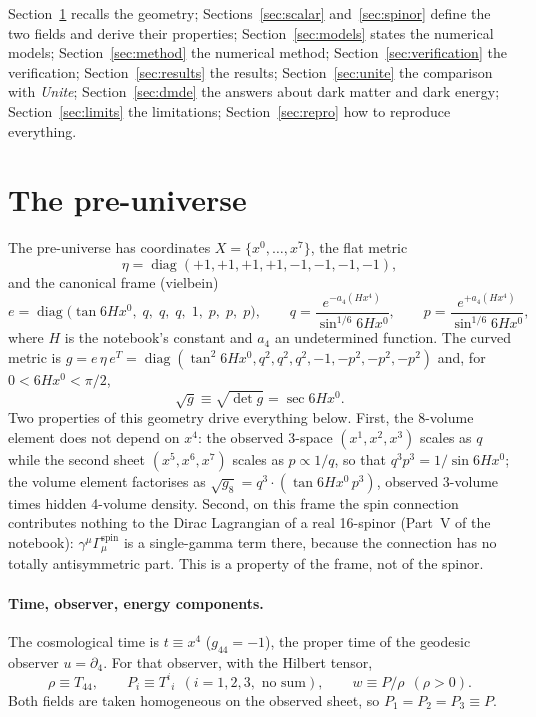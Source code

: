 \documentclass[11pt,a4paper]{article}
\newcommand{\diag}{\operatorname{diag}}
\begin{document}
Section~\ref{sec:frame} recalls the geometry; Sections~\ref{sec:scalar} and~\ref{sec:spinor}
define the two fields and derive their properties; Section~\ref{sec:models} states the numerical
models; Section~\ref{sec:method} the numerical method; Section~\ref{sec:verification} the
verification; Section~\ref{sec:results} the results; Section~\ref{sec:unite} the comparison with
\emph{Unite}; Section~\ref{sec:dmde} the answers about dark matter and dark energy;
Section~\ref{sec:limits} the limitations; Section~\ref{sec:repro} how to reproduce everything.

\section{The pre-universe}\label{sec:frame}

The pre-universe has coordinates $X=\{x^0,\dots,x^7\}$, the flat metric
\begin{equation}\label{eq:eta}
  \eta=\diag(+1,+1,+1,+1,-1,-1,-1,-1),
\end{equation}
and the canonical frame (vielbein)
\begin{equation}\label{eq:frame}
  e=\diag\bigl(\tan 6Hx^0,\;q,\;q,\;q,\;1,\;p,\;p,\;p\bigr),\qquad
  q=\frac{e^{-a_4(Hx^4)}}{\sin^{1/6}6Hx^0},\qquad
  p=\frac{e^{+a_4(Hx^4)}}{\sin^{1/6}6Hx^0},
\end{equation}
where $H$ is the notebook's constant and $a_4$ an undetermined function. The curved metric is
$g=e\,\eta\,e^{T}=\diag(\tan^2 6Hx^0,q^2,q^2,q^2,-1,-p^2,-p^2,-p^2)$ and, for $0<6Hx^0<\pi/2$,
\begin{equation}\label{eq:volume}
  \sqrt{g}\equiv\sqrt{\det g}=\sec 6Hx^0 .
\end{equation}
Two properties of this geometry drive everything below. First, the 8-volume element does not
depend on $x^4$: the observed 3-space $(x^1,x^2,x^3)$ scales as $q$ while the second sheet
$(x^5,x^6,x^7)$ scales as $p\propto1/q$, so that $q^3p^3=1/\sin 6Hx^0$; the volume element
factorises as $\sqrt{g_8}=q^3\cdot(\tan 6Hx^0\,p^3)$, observed 3-volume times hidden 4-volume
density. Second, on this frame the spin connection contributes nothing to the Dirac Lagrangian of
a real 16-spinor (Part~V of the notebook): $\gamma^\mu\Gamma^{\mathrm{spin}}_\mu$ is a
single-gamma term there, because the connection has no totally antisymmetric part. This is a
property of the frame, not of the spinor.

\paragraph{Time, observer, energy components.} The cosmological time is $t\equiv x^4$
($g_{44}=-1$), the proper time of the geodesic observer $u=\partial_4$. For that observer, with
the Hilbert tensor,
\begin{equation}\label{eq:rhoP}
  \rho\equiv T_{44},\qquad P_i\equiv T^i{}_i\ \ (i=1,2,3,\text{ no sum}),\qquad w\equiv P/\rho\ \ (\rho>0).
\end{equation}
Both fields are taken homogeneous on the observed sheet, so $P_1=P_2=P_3\equiv P$.
\end{document}
